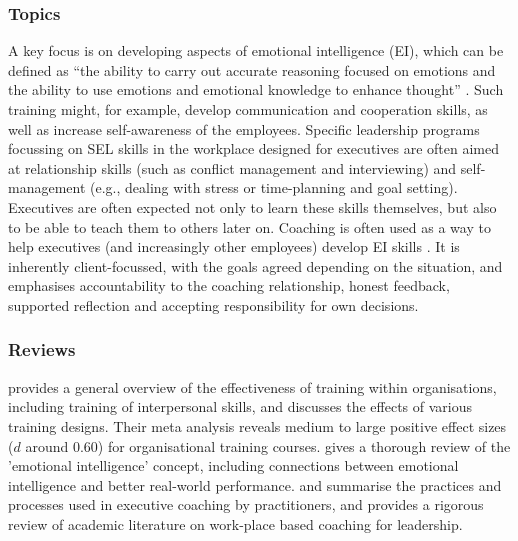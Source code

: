 \documentclass[prodmode,acmtochi]{acmsmall}
\newcommand{\GeraldineFIX}[1]{}
\begin{document}
\subsubsection*{Topics} 
        A key focus is on developing aspects of emotional intelligence (EI), which can be defined as ``the ability to carry out accurate reasoning focused on emotions and the ability to use emotions and emotional knowledge to enhance thought'' \cite{Mayer2008}. Such training might, for example, develop communication and cooperation skills, as well as increase self-awareness of the employees. 
%        
        Specific leadership programs focussing on SEL skills in the workplace designed for executives are often aimed at relationship skills (such as conflict management and interviewing) and self-management (e.g., dealing with stress or time-planning and goal setting). Executives are often expected not only to learn these skills themselves, but also to be able to teach them to others later on. Coaching is often used as a way to help executives (and increasingly other employees) develop EI skills \cite{Bono2009}. It is inherently client-focussed, with the goals agreed depending on the situation, and emphasises accountability to the coaching relationship, honest feedback, supported reflection and accepting responsibility for own decisions. 

\GeraldineFIX{G: Not just for executives though in the workplace - this can sound like it is only for execs?    P: That's what the reviews I found focused on ... perhaps still mainly used for execs, as very expensive to roll-out more widely? Or perhaps not that much literature on it?}

\subsubsection*{Reviews}   provides a general overview of the effectiveness of training within organisations, including training of interpersonal skills, and discusses the effects of various training designs. Their meta analysis reveals medium to large positive effect sizes  ($d$ around $0.60$) for organisational training courses.  gives a thorough review of the 'emotional intelligence' concept, including connections between emotional intelligence and better real-world performance.    and  summarise the practices and processes used in executive coaching by practitioners, and  provides a rigorous review of academic literature on work-place based coaching for leadership. \GeraldineFIX{G: ??? seeing you also mention coaching under the personal area?? ... P: But this review really does talk about work-place only, with particular focus on leadership}
\end{document}
